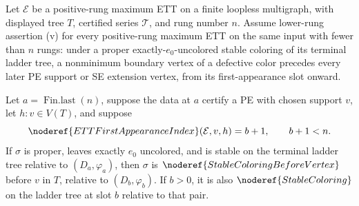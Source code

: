 \begin{helper}
Let \(\mathcal E\) be a positive-rung maximum ETT on a finite loopless
multigraph, with displayed tree \(T\), certified series \(\mathcal T\), and
rung number \(n\).  Assume lower-rung assertion (v) for every positive-rung
maximum ETT on the same input with fewer than \(n\) rungs: under a proper
exactly-\(e_0\)-uncolored stable coloring of its terminal ladder tree, a
nonminimum boundary vertex of a defective color precedes every later PE
support or SE extension vertex, from its first-appearance slot onward.

Let \(a=\operatorname{Fin.last}(n)\), suppose the data at \(a\) certify a PE
with chosen support \(v\), let \(h:v\in V(T)\), and suppose
\[
 \noderef{ETTFirstAppearanceIndex}(\mathcal E,v,h)=b+1,
 \qquad b+1<n.
\]
If \(\sigma\) is proper, leaves exactly \(e_0\) uncolored, and is stable on
the terminal ladder tree relative to \((D_a,\varphi_a)\), then \(\sigma\)
is \(\noderef{StableColoringBeforeVertex}\) before \(v\) in \(T\), relative
to \((D_b,\varphi_b)\).  If \(b>0\), it is also
\(\noderef{StableColoring}\) on the ladder tree at slot \(b\) relative to
that pair.
\end{helper}
